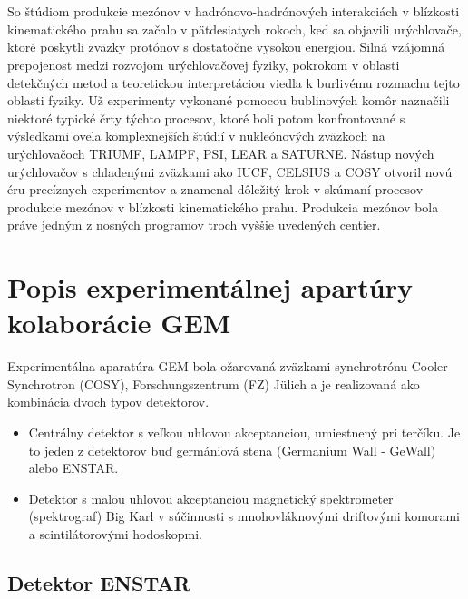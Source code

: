 \documentclass[12pt,oneside,slovak]{book}
\begin{document}
{ %
  \renewcommand{\chaptername}[2]{Úvod}
  \chapter{}

  So štúdiom produkcie mezónov v hadrónovo-hadrónových interakciách v blízkosti
  kinematického prahu sa začalo v pätdesiatych rokoch, ked sa objavili
  urýchlovače, ktoré poskytli zväzky protónov s dostatočne vysokou
  energiou. Silná vzájomná prepojenost medzi rozvojom urýchlovačovej fyziky,
  pokrokom v oblasti detekčných metod a teoretickou interpretáciou viedla k
  burlivému rozmachu tejto oblasti fyziky. Už experimenty vykonané pomocou
  bublinových komôr naznačili niektoré typické črty týchto procesov, ktoré boli
  potom konfrontované s výsledkami ovela komplexnejších štúdií v nukleónových
  zväzkoch na urýchlovačoch TRIUMF, LAMPF, PSI, LEAR a SATURNE. Nástup nových
  urýchlovačov s chladenými zväzkami ako IUCF, CELSIUS a COSY otvoril novú éru
  precíznych experimentov a znamenal dôležitý krok v skúmaní procesov produkcie
  mezónov v blízkosti kinematického prahu. Produkcia mezónov bola práve jedným z
  nosných programov troch vyššie uvedených centier.
} %

\setcounter{chapter}{0}
\chapter{Popis experimentálnej apartúry kolaborácie GEM}

Experimentálna aparatúra GEM bola ožarovaná zväzkami synchrotrónu Cooler
Synchrotron (COSY), Forschungszentrum (FZ) Jülich a je realizovaná ako
kombinácia dvoch typov detektorov.
\begin{itemize}
\item
  Centrálny detektor s veľkou uhlovou akceptanciou, umiestnený pri terčíku. Je
  to jeden z detektorov buď germániová stena (Germanium Wall - GeWall) alebo
  ENSTAR.
\item
  Detektor s malou uhlovou akceptanciou magnetický spektrometer (spektrograf)
  Big Karl v súčinnosti s mnohovláknovými driftovými komorami a scintilátorovými
  hodoskopmi.
\end{itemize}

\section{Detektor ENSTAR}
\end{document}
